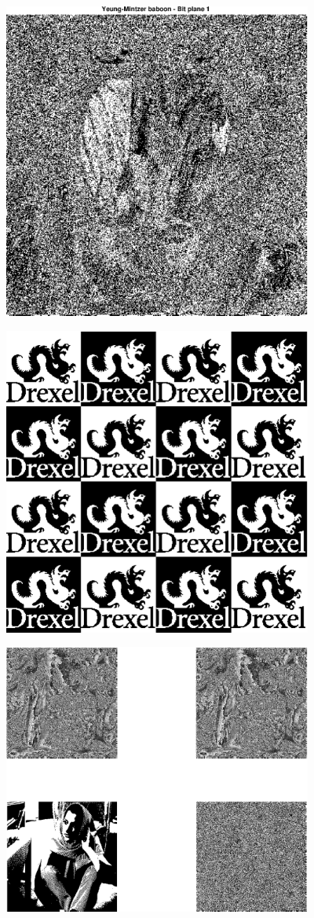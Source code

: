 \documentclass{article}
\begin{document}
\includegraphics [width=4in]{lab3_06.eps}

\includegraphics [width=4in]{lab3_07.eps}

\includegraphics [width=4in]{lab3_08.eps}
\end{document}
